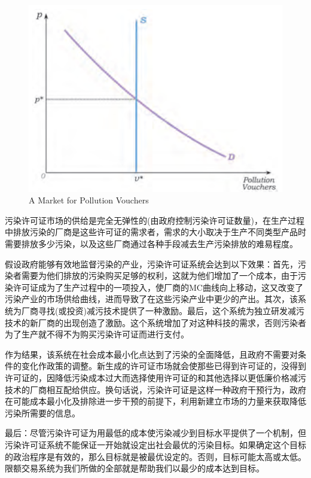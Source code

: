 \documentclass{article}
\begin{document}
\begin{figure}[H] %
	\centering %
	\includegraphics[width=1\textwidth]{21_3} %
	\caption{A Market for Pollution Vouchers} %
	\label{Fig.main4} %
\end{figure}

污染许可证市场的供给是完全无弹性的(由政府控制污染许可证数量)，在生产过程中排放污染的厂商是这些许可证的需求者，需求的大小取决于生产不同类型产品时需要排放多少污染，以及这些厂商通过各种手段减去生产污染排放的难易程度。

假设政府能够有效地监督污染的产业，污染许可证系统会达到以下效果：首先，污染者需要为他们排放的污染购买足够的权利，这就为他们增加了一个成本，由于污染许可证成为了生产过程中的一项投入，使厂商的MC曲线向上移动，这又改变了污染产业的市场供给曲线，进而导致了在这些污染产业中更少的产出。其次，该系统为厂商寻找(或投资)减污技术提供了一种激励。最后，这个系统为独立研发减污技术的新厂商的出现创造了激励。这个系统增加了对这种科技的需求，否则污染者为了生产就不得不为购买污染许可证而进行支付。

作为结果，该系统在社会成本最小化点达到了污染的全面降低，且政府不需要对条件的变化作政策的调整。新生成的许可证市场就会使那些已得到许可证的，没得到许可证的，因降低污染成本过大而选择使用许可证的和其他选择以更低廉价格减污技术的厂商相互配给供应。换句话说，污染许可证是这样一种政府干预行为，政府在可能成本最小化及排除进一步干预的前提下，利用新建立市场的力量来获取降低污染所需要的信息。

最后：尽管污染许可证为用最低的成本使污染减少到目标水平提供了一个机制，但污染许可证系统不能保证一开始就设定出社会最优的污染目标。如果确定这个目标的政治程序是有效的，那么目标就是被最优设定的。否则，目标可能太高或太低。限额交易系统为我们所做的全部就是帮助我们以最少的成本达到目标。
\end{document}
